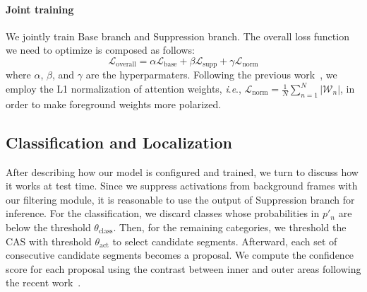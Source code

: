 \documentclass[letterpaper]{article} %
\newcommand{\ie}{\textit{i}.\textit{e}.}
\begin{document}
\paragraph{Joint training}
We jointly train Base branch and Suppression branch. The overall loss function we need to optimize is composed as follows:
\begin{equation}
  \label{equ:loss_total}
  \mathcal{L}_{\text{overall}} = \alpha \mathcal{L}_{\text{base}} + \beta \mathcal{L}_{\text{supp}} + \gamma \mathcal{L}_{\text{norm}}
\end{equation}
where $\alpha$, $\beta$, and $\gamma$ are the hyperparmaters. Following the previous work~\cite{nguyen2018weakly,Xu2019SegregatedTA}, we employ the L1 normalization of attention weights, \ie, $\mathcal{L}_{\text{norm}}=\frac{1}{N}\sum_{n=1}^{N}|\mathcal{W}_{n}|$, in order to make foreground weights more polarized.

\subsection{Classification and Localization}
After describing how our model is configured and trained, we turn to discuss how it works at test time. Since we suppress activations from background frames with our filtering module, it is reasonable to use the output of Suppression branch for inference. For the classification, we discard classes whose probabilities in ${p'_{n}}$ are below the threshold $\theta _{\text{class}}$. Then, for the remaining categories, we threshold the CAS with threshold $\theta _{\text{act}}$ to select candidate segments. Afterward, each set of consecutive candidate segments becomes a proposal. We compute the confidence score for each proposal using the contrast between inner and outer areas following the recent work~\cite{liu2019completeness}.
\end{document}
